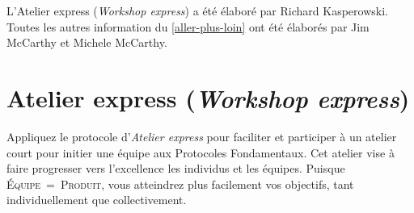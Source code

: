 \documentclass[paper=6in:9in,pagesize=pdftex,headinclude=on,footinclude=on,11pt]{scrbook}
\newcommand*{\numref}[1]{{\hyperref[{#1}]{\autoref*{#1}}}}
\let\oldsection\section
\renewcommand\section{\clearpage\oldsection}
\begin{document}
L'Atelier express (\emph{Workshop express}) a été élaboré par Richard Kasperowski. Toutes les autres information du \numref{aller-plus-loin} ont été
élaborés par Jim McCarthy et Michele McCarthy.

\section{Atelier express (\emph{Workshop express})} \label{atelier-express}

Appliquez le protocole d'\emph{Atelier express} pour faciliter et participer à un atelier court pour initier une équipe aux Protocoles Fondamentaux. Cet
atelier vise à faire progresser vers l'excellence les individus et les équipes. Puisque \textsc{Équipe~=~Produit}, vous atteindrez plus facilement vos
objectifs, tant individuellement que collectivement.
\end{document}
